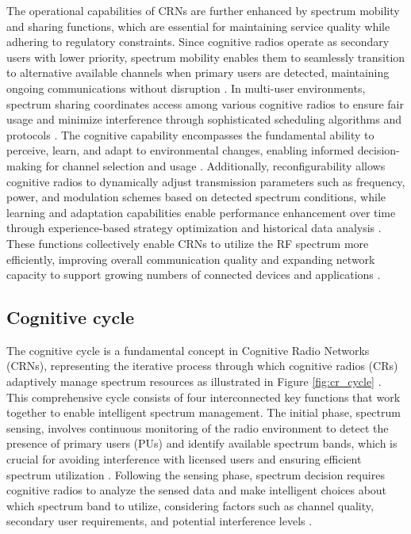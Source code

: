 The operational capabilities of CRNs are further enhanced by spectrum mobility and sharing functions, which are essential for maintaining service quality while adhering to regulatory constraints. Since cognitive radios operate as secondary users with lower priority, spectrum mobility enables them to seamlessly transition to alternative available channels when primary users are detected, maintaining ongoing communications without disruption \cite{ref1,ref3}. In multi-user environments, spectrum sharing coordinates access among various cognitive radios to ensure fair usage and minimize interference through sophisticated scheduling algorithms and protocols \cite{ref1,ref3}. The cognitive capability encompasses the fundamental ability to perceive, learn, and adapt to environmental changes, enabling informed decision-making for channel selection and usage \cite{ref1,ref2}. Additionally, reconfigurability allows cognitive radios to dynamically adjust transmission parameters such as frequency, power, and modulation schemes based on detected spectrum conditions, while learning and adaptation capabilities enable performance enhancement over time through experience-based strategy optimization and historical data analysis \cite{ref1,ref3,ref9,ref19}. These functions collectively enable CRNs to utilize the RF spectrum more efficiently, improving overall communication quality and expanding network capacity to support growing numbers of connected devices and applications \cite{ref1,ref2,ref3}.


\subsection{\textbf{Cognitive cycle}}

The cognitive cycle is a fundamental concept in Cognitive Radio Networks (CRNs), representing the iterative process through which cognitive radios (CRs) adaptively manage spectrum resources as illustrated in Figure \ref{fig:cr_cycle} \cite{ref1,ref3}. This comprehensive cycle consists of four interconnected key functions that work together to enable intelligent spectrum management. The initial phase, spectrum sensing, involves continuous monitoring of the radio environment to detect the presence of primary users (PUs) and identify available spectrum bands, which is crucial for avoiding interference with licensed users and ensuring efficient spectrum utilization \cite{ref1,ref4,ref6}. Following the sensing phase, spectrum decision requires cognitive radios to analyze the sensed data and make intelligent choices about which spectrum band to utilize, considering factors such as channel quality, secondary user requirements, and potential interference levels \cite{ref1,ref3}.

